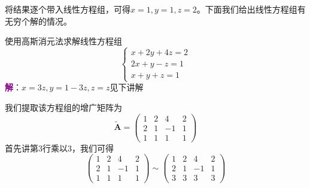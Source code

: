 将结果逐个带入线性方程组，可得$x=1,y=1,z=2$。下面我们给出线性方程组有无穷个解的情况。

\begin{example}
	使用高斯消元法求解线性方程组$$\left\{\begin{matrix} 
	x+2y+4z=2 \\  
	2x+y-z=1\\
	x+y+z=1
\end{matrix}\right. $$
\tcblower
\textcolor{purple}{\textbf{解}}：$x=3z,y=1-3z,z=z$见下讲解
\end{example}

我们提取该方程组的增广矩阵为$$\tilde{\mathbf{A}}=\begin{pmatrix}
	1 & 2 & 4 & 2\\
	2 & 1 & -1 & 1\\
	1 & 1 & 1 & 1
\end{pmatrix}$$首先讲第3行乘以3，我们可得$$\begin{pmatrix}
	1 & 2 & 4 & 2\\
	2 & 1 & -1 & 1\\
	1 & 1 & 1 & 1
   \end{pmatrix}\sim \begin{pmatrix}
	1 & 2 & 4 & 2\\
	2 & 1 & -1 & 1\\
	3 & 3 & 3 & 3
\end{pmatrix}$$